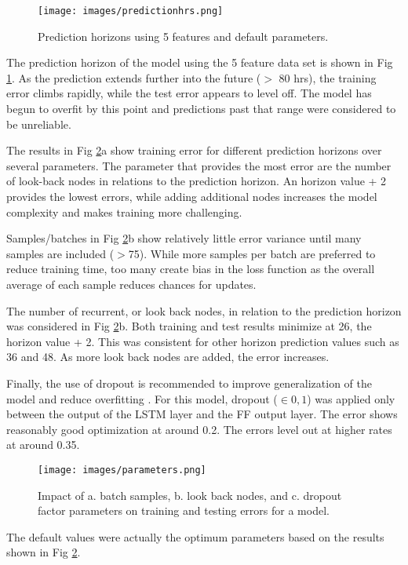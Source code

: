 \documentclass[preprint,12pt,authoryear]{elsarticle}
\begin{document}
\begin{linenumbers}
%
\begin{figure}[H]
\centering
\texttt{[image: images/predictionhrs.png]}  %
\caption{Prediction horizons using 5 features and default parameters.}
\label{fig:predictionhrs}
\end{figure}
%
The prediction horizon of the model using the 5 feature data set is shown in Fig \ref{fig:predictionhrs}.  As the prediction extends further into the future ($>$ 80 hrs), the training error climbs rapidly, while the test error appears to level off. The model has begun to overfit by this point and predictions past that range were considered to be unreliable.

The results in  Fig \ref{fig:parameters}a show training error for different prediction horizons over several parameters. The parameter that provides the most error are the number of look-back nodes in relations to the prediction horizon. An horizon value + 2 provides the lowest errors, while adding additional nodes increases the model complexity and makes training more challenging. 

Samples/batches in Fig \ref{fig:parameters}b show relatively little error variance until many samples are included ($>$75). While more samples per batch are preferred to reduce training time, too many create bias in the loss function as the overall average of each sample reduces chances for updates.

The number of recurrent, or look back nodes, in relation to the prediction horizon was considered in  Fig \ref{fig:parameters}b. Both training and test results minimize at 26, the horizon value + 2. This was consistent for other horizon prediction values such as 36 and 48. As more look back nodes are added, the error increases.

Finally, the use of dropout is recommended to improve generalization of the model and reduce overfitting \citep{Gal2016}. For this model, dropout ($\in 0,1$) was applied only between the output of the LSTM layer and the FF output layer. The error shows reasonably good optimization at around 0.2. The errors level out at higher rates at around 0.35. 
%
\begin{figure}[H]
\centering
\texttt{[image: images/parameters.png]}  %
\caption{Impact of a. batch samples, b. look back nodes, and c. dropout factor parameters on training and testing errors for a model.}
\label{fig:parameters}
\end{figure}
%
The default values were actually the optimum parameters based on the results shown in Fig \ref{fig:parameters}.



\end{linenumbers}
\end{document}
